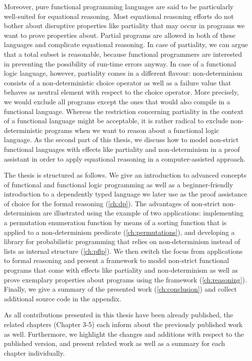Moreover, pure functional programming languages are said to be particularly well-suited for equational reasoning.
Most equational reasoning efforts do not bother about disruptive properties like partiality that may occur in programs we want to prove properties about.
Partial programs are allowed in both of these languages and complicate equational reasoning.
In case of partiality, we can argue that a total subset is reasonable, because functional programmers are interested in preventing the possibility of run-time errors anyway.
In case of a functional logic language, however, partiality comes in a different flavour: non-determinism consists of a non-deterministic choice operator as well as a failure value that behaves as neutral element with respect to the choice operator.
More precisely, we would exclude all programs except the ones that would also compile in a functional language.
Whereas the restriction concerning partiality in the context of a functional language might be acceptable, it is rather radical to exclude non-deterministic programs when we want to reason about a functional logic language.
As the second part of this thesis, we discuss how to model non-strict functional languages with effects like partiality and non-determinism in a proof assistant in order to apply equational reasoning in a computer-assisted approach.

The thesis is structured as follows. We give an introduction to advanced concepts of functional and functional logic programming as well as a beginner-friendly introduction to a dependently typed language we later use as the proof assistance of choice for the formal reasoning (\autoref{ch:dp}).
The advantages of non-strict non-determinism are illustrated using the example of two applications: implementing a permutation enumeration function by means of a sorting function that is applied to a non-determinism predicate (\autoref{ch:permutations}), and developing a library for probabilistic programming that relies on non-determinism instead of lists as internal structure (\autoref{ch:pflp}).
We then switch the focus from applications to formal reasoning and present a framework to model non-strict functional programs that come with effects like partiality and non-determinism as well as prove exemplary properties about programs using the framework (\autoref{ch:reasoning}).
Finally, we give a summary of the presented work (\autoref{ch:conclusion}) and collect additional source code in the appendix.

As all contributions presented in this thesis have been already published, the related chapters (Chapter 3-5) each inform about the previously published work as well.
Furthermore, we highlight the changes and additions with respect to the published version, and present related work as well as a summary for each chapter individually.